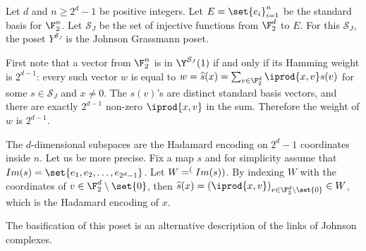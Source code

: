 \begin{example}
    Let \(d\) and \(n \geq 2^d-1\) be positive integers. Let \(E = \set{e_i}_{i=1}^n\) be the standard basis for \(\F_2^n\). Let \(\mathcal{S}_J\) be the set of injective functions from \(\F_2^d\) to \(E\). For this \(\mathcal{S}_J\), the poset \(Y^{\mathcal{S}_J}\) is the Johnson Grassmann poset.
    
    First note that a vector from \( \F_2^n\) is in \(\Y^{\mathcal{S}_J}(1)\) if and only if its Hamming weight is \(2^{d-1}\): every such vector \(w\) is equal to \(w = \widehat{s}(x) = \sum_{v \in \F_2^d} \iprod{x,v} s(v)\) for some \(s \in \mathcal{S}_J\) and \(x \ne 0\). The \(s(v)\)'s are distinct standard basis vectors, and there are exactly \(2^{d-1}\) non-zero \(\iprod{x,v}\) in the sum. Therefore the weight of \(w\) is \(2^{d-1}\).

    The \(d\)-dimensional subspaces are the Hadamard encoding on \(2^d-1\) coordinates inside \(n\). Let us be more precise. Fix a map \(s\) and for simplicity assume that \(Im(s) = \set{e_1,e_2,\dots,e_{2^d-1}}\). Let \(W = \sp (Im(s))\). By indexing \(W\) with the coordinates of \(v \in \F_2^{d} \setminus \set{0}\), then \(\widehat{s}(x) = \left ( \iprod{x,v} \right )_{v \in \F_2^{d} \setminus \set{0}} \in W\), which is the Hadamard encoding of \(x\).

    The basification of this poset is an alternative description of the links of Johnson complexes.
\end{example}

